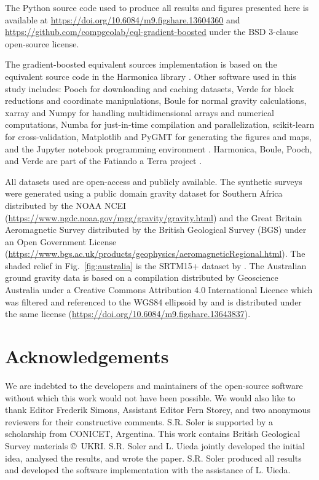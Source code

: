The Python source code used to produce all results and figures presented here
is available at
\url{https://doi.org/10.6084/m9.figshare.13604360} and
\url{https://github.com/compgeolab/eql-gradient-boosted}
under the BSD 3-clause open-source license.

The gradient-boosted equivalent sources implementation is based on the
equivalent source code in the Harmonica library \citep{harmonica2020}.
Other software used in this study includes:
Pooch \citep{pooch2020} for downloading and caching datasets,
Verde \citep{verde2018} for block reductions and coordinate manipulations,
Boule \citep{boule2020} for normal gravity calculations,
xarray \citep{xarray2017} and Numpy \citep{numpy2020} for handling
multidimensional arrays and numerical computations,
Numba \citep{numba2015} for just-in-time compilation and parallelization,
scikit-learn \citep{sklearn2011} for cross-validation,
Matplotlib \citep{matplotlib2007} and PyGMT \citep{pygmt2020} for generating
the figures and maps,
and the Jupyter notebook programming environment \citep{jupyter2016}.
Harmonica, Boule, Pooch, and Verde are part of the Fatiando a Terra project
\citep{fatiando2013}.

All datasets used are open-access and publicly available.
The synthetic surveys were generated using
a public domain gravity dataset for Southern Africa distributed by the
NOAA NCEI (\url{https://www.ngdc.noaa.gov/mgg/gravity/gravity.html})
and the Great Britain Aeromagnetic
Survey distributed by the
British Geological Survey (BGS) under an Open Government License
(\url{https://www.bgs.ac.uk/products/geophysics/aeromagneticRegional.html}).
The shaded relief in Fig.~\ref{fig:australia} is the SRTM15+ dataset by
\citet{tozer2019}.
The Australian ground gravity
data is based on a compilation distributed by Geoscience Australia under a
Creative Commons Attribution 4.0 International Licence \citep{wynne2018}  which
was filtered and referenced to the WGS84 ellipsoid by
\citet{australia_compilation} and is distributed under the same license
(\url{https://doi.org/10.6084/m9.figshare.13643837}).



\section{Acknowledgements}

We are indebted to the developers and maintainers of the open-source software
without which this work would not have been possible.
We would also like to thank Editor Frederik Simons, Assistant Editor Fern
Storey, and two anonymous reviewers for their constructive comments.
S.R. Soler is supported by a scholarship from CONICET, Argentina.
This work contains British Geological Survey materials ©~UKRI.
S.R. Soler and L. Uieda jointly developed the initial idea, analysed the
results, and wrote the paper. S.R. Soler produced all results and developed the
software implementation with the assistance of L. Uieda.
